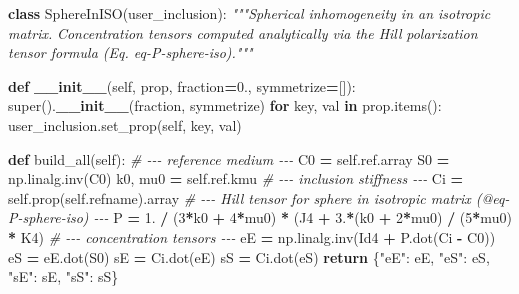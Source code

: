 \documentclass[
  a4paper,
  numbers=noendperiod,
  DIV=12]{scrreprt}
\newenvironment{Shaded}{\begin{snugshade}}{\end{snugshade}}
\newcommand{\BuiltInTok}[1]{#1}
\newcommand{\CommentTok}[1]{\textcolor[rgb]{0.56,0.35,0.01}{\textit{#1}}}
\newcommand{\ControlFlowTok}[1]{\textcolor[rgb]{0.13,0.29,0.53}{\textbf{#1}}}
\newcommand{\DecValTok}[1]{\textcolor[rgb]{0.00,0.00,0.81}{#1}}
\newcommand{\FloatTok}[1]{\textcolor[rgb]{0.00,0.00,0.81}{#1}}
\newcommand{\FunctionTok}[1]{\textcolor[rgb]{0.13,0.29,0.53}{\textbf{#1}}}
\newcommand{\KeywordTok}[1]{\textcolor[rgb]{0.13,0.29,0.53}{\textbf{#1}}}
\newcommand{\NormalTok}[1]{#1}
\newcommand{\OperatorTok}[1]{\textcolor[rgb]{0.81,0.36,0.00}{\textbf{#1}}}
\newcommand{\StringTok}[1]{\textcolor[rgb]{0.31,0.60,0.02}{#1}}
\newcommand{\VariableTok}[1]{\textcolor[rgb]{0.00,0.00,0.00}{#1}}
\begin{document}
\begin{Shaded}
\begin{Highlighting}[]
\KeywordTok{class}\NormalTok{ SphereInISO(user\_inclusion):}
    \CommentTok{"""Spherical inhomogeneity in an isotropic matrix.}
\CommentTok{    Concentration tensors computed analytically via the Hill}
\CommentTok{    polarization tensor formula (Eq. eq{-}P{-}sphere{-}iso)."""}

    \KeywordTok{def} \FunctionTok{\_\_init\_\_}\NormalTok{(}\VariableTok{self}\NormalTok{, prop, fraction}\OperatorTok{=}\FloatTok{0.}\NormalTok{, symmetrize}\OperatorTok{=}\NormalTok{[]):}
        \BuiltInTok{super}\NormalTok{().}\FunctionTok{\_\_init\_\_}\NormalTok{(fraction, symmetrize)}
        \ControlFlowTok{for}\NormalTok{ key, val }\KeywordTok{in}\NormalTok{ prop.items():}
\NormalTok{            user\_inclusion.set\_prop(}\VariableTok{self}\NormalTok{, key, val)}

    \KeywordTok{def}\NormalTok{ build\_all(}\VariableTok{self}\NormalTok{):}
        \CommentTok{\# {-}{-}{-} reference medium {-}{-}{-}}
\NormalTok{        C0      }\OperatorTok{=} \VariableTok{self}\NormalTok{.ref.array}
\NormalTok{        S0      }\OperatorTok{=}\NormalTok{ np.linalg.inv(C0)}
\NormalTok{        k0, mu0 }\OperatorTok{=} \VariableTok{self}\NormalTok{.ref.kmu}
        \CommentTok{\# {-}{-}{-} inclusion stiffness {-}{-}{-}}
\NormalTok{        Ci }\OperatorTok{=} \VariableTok{self}\NormalTok{.prop(}\VariableTok{self}\NormalTok{.refname).array}
        \CommentTok{\# {-}{-}{-} Hill tensor for sphere in isotropic matrix (@eq{-}P{-}sphere{-}iso) {-}{-}{-}}
\NormalTok{        P  }\OperatorTok{=} \FloatTok{1.} \OperatorTok{/}\NormalTok{ (}\DecValTok{3}\OperatorTok{*}\NormalTok{k0 }\OperatorTok{+} \DecValTok{4}\OperatorTok{*}\NormalTok{mu0) }\OperatorTok{*}\NormalTok{ (J4 }\OperatorTok{+} \FloatTok{3.}\OperatorTok{*}\NormalTok{(k0 }\OperatorTok{+} \DecValTok{2}\OperatorTok{*}\NormalTok{mu0) }\OperatorTok{/}\NormalTok{ (}\DecValTok{5}\OperatorTok{*}\NormalTok{mu0) }\OperatorTok{*}\NormalTok{ K4)}
        \CommentTok{\# {-}{-}{-} concentration tensors {-}{-}{-}}
\NormalTok{        eE }\OperatorTok{=}\NormalTok{ np.linalg.inv(Id4 }\OperatorTok{+}\NormalTok{ P.dot(Ci }\OperatorTok{{-}}\NormalTok{ C0))}
\NormalTok{        eS }\OperatorTok{=}\NormalTok{ eE.dot(S0)}
\NormalTok{        sE }\OperatorTok{=}\NormalTok{ Ci.dot(eE)}
\NormalTok{        sS }\OperatorTok{=}\NormalTok{ Ci.dot(eS)}
        \ControlFlowTok{return}\NormalTok{ \{}\StringTok{"eE"}\NormalTok{: eE, }\StringTok{"eS"}\NormalTok{: eS, }\StringTok{"sE"}\NormalTok{: sE, }\StringTok{"sS"}\NormalTok{: sS\}}
\end{Highlighting}
\end{Shaded}
\end{document}
